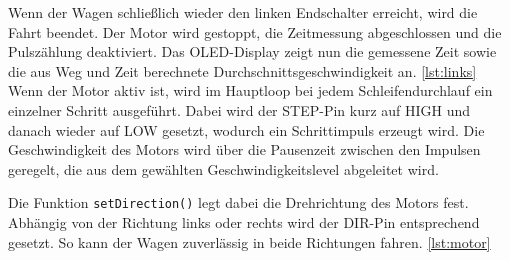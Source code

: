 Wenn der Wagen schließlich wieder den linken Endschalter erreicht, wird die Fahrt beendet. Der Motor wird gestoppt, die Zeitmessung abgeschlossen und die Pulszählung deaktiviert. Das OLED-Display zeigt nun die gemessene Zeit sowie die aus Weg und Zeit berechnete Durchschnittsgeschwindigkeit an. \autoref{lst:links}\\

Wenn der Motor aktiv ist, wird im Hauptloop bei jedem Schleifendurchlauf ein einzelner Schritt ausgeführt. Dabei wird der STEP-Pin kurz auf HIGH und danach wieder auf LOW gesetzt, wodurch ein Schrittimpuls erzeugt wird. Die Geschwindigkeit des Motors wird über die Pausenzeit zwischen den Impulsen geregelt, die aus dem gewählten Geschwindigkeitslevel abgeleitet wird. 

Die Funktion \texttt{setDirection()} legt dabei die Drehrichtung des Motors fest. Abhängig von der Richtung links oder rechts wird der DIR-Pin entsprechend gesetzt. So kann der Wagen zuverlässig in beide Richtungen fahren. \autoref{lst:motor}
